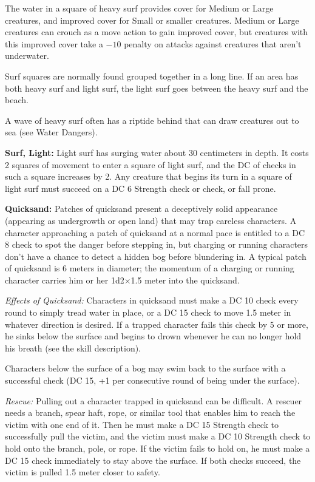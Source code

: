 The water in a square of heavy surf provides cover for Medium or Large creatures, and improved cover for Small or smaller creatures. Medium or Large creatures can crouch as a move action to gain improved cover, but creatures with this improved cover take a $-10$ penalty on attacks against creatures that aren't underwater.

Surf squares are normally found grouped together in a long line. If an area has both heavy surf and light surf, the light surf goes between the heavy surf and the beach.

A wave of heavy surf often has a riptide behind that can draw creatures out to sea (see Water Dangers).


\textbf{Surf, Light:} Light surf has surging water about 30 centimeters in depth. It costs 2 squares of movement to enter a square of light surf, and the DC of  checks in such a square increases by 2. Any creature that begins its turn in a square of light surf must succeed on a DC 6 Strength check or  check, or fall prone.


\textbf{Quicksand:} Patches of quicksand present a deceptively solid appearance (appearing as undergrowth or open land) that may trap careless characters. A character approaching a patch of quicksand at a normal pace is entitled to a DC 8  check to spot the danger before stepping in, but charging or running characters don't have a chance to detect a hidden bog before blundering in. A typical patch of quicksand is 6 meters in diameter; the momentum of a charging or running character carries him or her 1d2$\times$1.5 meter into the quicksand.

\textit{Effects of Quicksand:} Characters in quicksand must make a DC 10  check every round to simply tread water in place, or a DC 15  check to move 1.5 meter in whatever direction is desired. If a trapped character fails this check by 5 or more, he sinks below the surface and begins to drown whenever he can no longer hold his breath (see the  skill description).

Characters below the surface of a bog may swim back to the surface with a successful  check (DC 15, +1 per consecutive round of being under the surface).

\textit{Rescue:} Pulling out a character trapped in quicksand can be difficult. A rescuer needs a branch, spear haft, rope, or similar tool that enables him to reach the victim with one end of it. Then he must make a DC 15 Strength check to successfully pull the victim, and the victim must make a DC 10 Strength check to hold onto the branch, pole, or rope. If the victim fails to hold on, he must make a DC 15  check immediately to stay above the surface. If both checks succeed, the victim is pulled 1.5 meter closer to safety.



